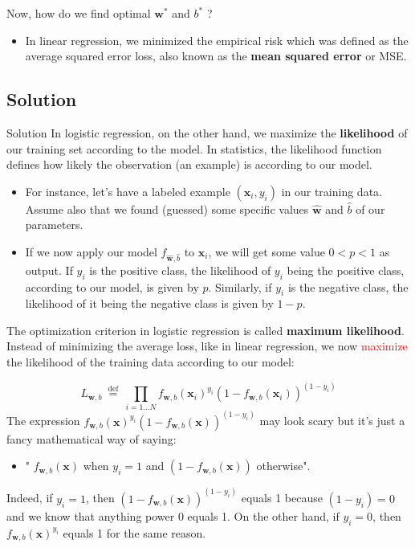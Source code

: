\documentclass[9pt,dvipsnames]{beamer}
\begin{document}
\begin{frame}
	Now, how do we find optimal $\mathbf{w}^{*}$ and $b^{*}$ ? 
	\begin{itemize}
		\item In linear regression, we minimized the empirical risk which was defined as the average squared error loss, also known as the \textbf{mean squared error} or MSE.
	\end{itemize}
\end{frame}
\subsection{Solution}
\begin{frame}{Solution}
	In logistic regression, on the other hand, we maximize the \textbf{likelihood} of our training set according to the model. In statistics, the likelihood function defines how likely the observation (an example) is according to our model.
	\begin{itemize}
		\item For instance, let's have a labeled example $\left(\mathbf{x}_{i}, y_{i}\right)$ in our training data. Assume also that we found (guessed) some specific values $\hat{\mathbf{w}}$ and $\hat{b}$ of our parameters. 
		\item If we now apply our model $f_{\hat{\mathbf{w}}, \hat{b}}$ to $\mathbf{x}_{i}$, we will get some value $0<p<1$ as output. If $y_{i}$ is the positive class, the likelihood of $y_{i}$ being the positive class, according to our model, is given by $p$. Similarly, if $y_{i}$ is the negative class, the likelihood of it being the negative class is given by $1-p$.
	\end{itemize}
\end{frame}

\begin{frame}
	The optimization criterion in logistic regression is called \textbf{maximum likelihood}. Instead of minimizing the average loss, like in linear regression, we now \textcolor{red}{maximize} the likelihood of the training data according to our model:
	
	$$
	L_{\mathbf{w}, b} \stackrel{\text { def }}{=} \prod_{i=1 \ldots N} f_{\mathbf{w}, b}\left(\mathbf{x}_{i}\right)^{y_{i}}\left(1-f_{\mathbf{w}, b}\left(\mathbf{x}_{i}\right)\right)^{\left(1-y_{i}\right)}
	$$
	The expression $f_{\mathbf{w}, b}(\mathbf{x})^{y_{i}}\left(1-f_{\mathbf{w}, b}(\mathbf{x})\right)^{\left(1-y_{i}\right)}$ may look scary but it's just a fancy mathematical way of saying: 
	
	\begin{itemize}
		\item " $f_{\mathbf{w}, b}(\mathbf{x})$ when $y_{i}=1$ and $\left(1-f_{\mathbf{w}, b}(\mathbf{x})\right)$ otherwise".
	\end{itemize}
	 Indeed, if $y_{i}=1$, then 
	$\left(1-f_{\mathbf{w}, b}(\mathbf{x})\right)^{\left(1-y_{i}\right)}$ equals 1 because $\left(1-y_{i}\right)=0$ and we know that anything power 0 equals 1. On the other hand, if $y_{i}=0$, then $f_{\mathbf{w}, b}(\mathbf{x})^{y_{i}}$ equals 1 for the same reason.
\end{frame}
\end{document}
